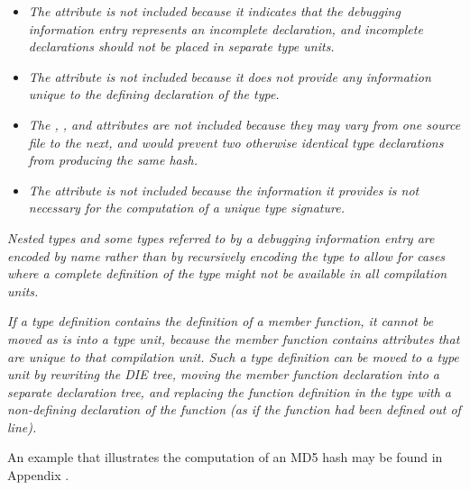 \begin{itemize}
\item \textit{The  attribute is not included because it
indicates that the debugging information entry represents an
incomplete declaration, and incomplete declarations should
not be placed in 
separate type units.}

\item \textit{The  attribute is not included because
it does not provide any information unique to the defining
declaration of the type.}

\item \textit{The , 
, and
 attributes are not included because they
may vary from one source file to the next, and would prevent
two otherwise identical type declarations from producing the
same hash.}

\item \textit{The  attribute is not included 
because the information it provides is not necessary for the 
computation of a unique type signature.}

\end{itemize}

\textit{Nested types and some types referred to by a debugging 
information entry are encoded by name rather than by recursively 
encoding the type to allow for cases where a complete definition 
of the type might not be available in all compilation units.}

\textit{If a type definition contains the definition of a member function, 
it cannot be moved as is into a type unit, because the member function 
contains attributes that are unique to that compilation unit. 
Such a type definition can be moved to a type unit by rewriting the DIE tree, 
moving the member function declaration into a separate declaration tree, 
and replacing the function definition in the type with a non-defining 
declaration of the function (as if the function had been defined out of 
line).}

An example that illustrates the computation of an MD5 hash may be found in 
Appendix .


